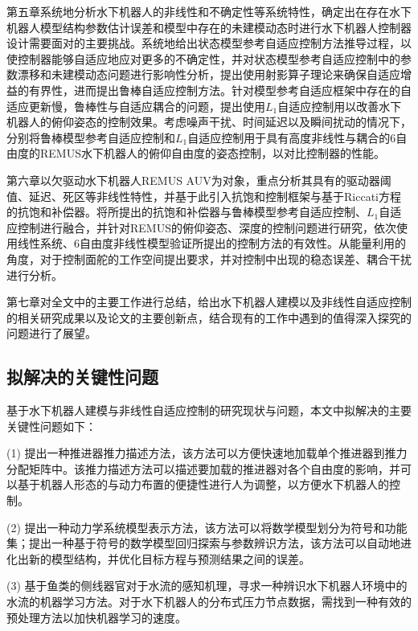 第五章系统地分析水下机器人的非线性和不确定性等系统特性，确定出在存在水下机器人模型结构参数估计误差和模型中存在的未建模动态时进行水下机器人控制器设计需要面对的主要挑战。系统地给出状态模型参考自适应控制方法推导过程，以使控制器能够自适应地应对更多的不确定性，并对状态模型参考自适应控制中的参数漂移和未建模动态问题进行影响性分析，提出使用射影算子理论来确保自适应增益的有界性，进而提出鲁棒自适应控制方法。针对模型参考自适应框架中存在的自适应更新慢，鲁棒性与自适应耦合的问题，提出使用$L_{1}$自适应控制用以改善水下机器人的俯仰姿态的控制效果。考虑噪声干扰、时间延迟以及瞬间扰动的情况下，分别将鲁棒模型参考自适应控制和$L_{1}$自适应控制用于具有高度非线性与耦合的6自由度的REMUS水下机器人的俯仰自由度的姿态控制，以对比控制器的性能。


第六章以欠驱动水下机器人REMUS AUV为对象，重点分析其具有的驱动器阈值、延迟、死区等非线性特性，并基于此引入抗饱和控制框架与基于Riccati方程的抗饱和补偿器。将所提出的抗饱和补偿器与鲁棒模型参考自适应控制、$L_{1}$自适应控制进行融合，并针对REMUS的俯仰姿态、深度的控制问题进行研究，依次使用线性系统、6自由度非线性模型验证所提出的控制方法的有效性。从能量利用的角度，对于控制面舵的工作空间提出要求，并对控制中出现的稳态误差、耦合干扰进行分析。


第七章对全文中的主要工作进行总结，给出水下机器人建模以及非线性自适应控制的相关研究成果以及论文的主要创新点，结合现有的工作中遇到的值得深入探究的问题进行了展望。


\subsection{拟解决的关键性问题 }

基于水下机器人建模与非线性自适应控制的研究现状与问题，本文中拟解决的主要关键性问题如下：

(1) 提出一种推进器推力描述方法，该方法可以方便快速地加载单个推进器到推力分配矩阵中。该推力描述方法可以描述要加载的推进器对各个自由度的影响，并可以基于机器人形态的与动力布置的便捷性进行人为调整，以方便水下机器人的控制。

(2) 提出一种动力学系统模型表示方法，该方法可以将数学模型划分为符号和功能集；提出一种基于符号的数学模型回归探索与参数辨识方法，该方法可以自动地进化出新的模型结构，并优化目标方程与预测结果之间的误差。


(3) 基于鱼类的侧线器官对于水流的感知机理，寻求一种辨识水下机器人环境中的水流的机器学习方法。对于水下机器人的分布式压力节点数据，需找到一种有效的预处理方法以加快机器学习的速度。

